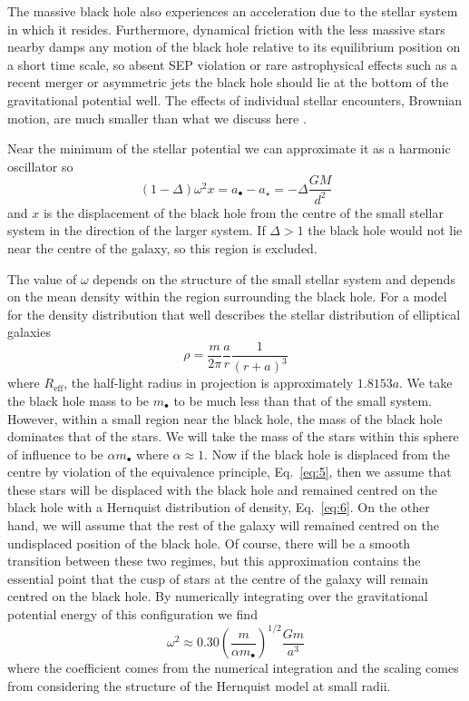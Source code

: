 \documentclass[useAMS,usenatbib]{mn2e}
\begin{document}
The massive black hole also experiences an acceleration due to the
stellar system in which it resides.  Furthermore, dynamical friction
with the less massive stars nearby damps any motion of the black hole
relative to its equilibrium position on a short time scale, so absent
SEP violation or rare astrophysical effects such as a recent merger or
asymmetric jets the black hole should lie at the bottom of the
gravitational potential well.  The effects of individual stellar
encounters, Brownian motion, are much smaller than what we discuss
here \citep{2011ApJ...735...57B}.

Near the minimum of the stellar potential we can approximate it as a
harmonic oscillator so
\begin{equation}
  \left (1 - \Delta \right) \omega^2 x
   = a_\bullet - a_\star = -\Delta \frac{GM}{d^2}
  \label{eq:5}
\end{equation}
and $x$ is the displacement of the black hole from the centre of the
small stellar system in the direction of the larger system. If
$\Delta>1$ the black hole would not lie near the centre of the galaxy,
so this region is excluded.

The value of $\omega$ depends on the structure of the small stellar
system and depends on the mean density within the region surrounding
the black hole.  For a \citet{1990ApJ...356..359H} model for the
density distribution that well describes the stellar distribution of
elliptical galaxies
\begin{equation}
  \rho = \frac{m}{2\pi} \frac{a}{r} \frac{1}{(r+a)^3}
  \label{eq:6}
\end{equation}
where $R_\mathrm{eff}$, the half-light radius in projection is
approximately $1.8153 a$.  We take the black hole mass to be
$m_\bullet$ to be much less than that of the small system.  However,
within a small region near the black hole, the mass of the black hole
dominates that of the stars.  We will take the mass of the stars
within this sphere of influence to be $\alpha m_\bullet$ where
$\alpha\approx 1$.  Now if the black hole is displaced from the centre
by violation of the equivalence principle, Eq.~\ref{eq:5}, then we
assume that these stars will be displaced with the black hole and
remained centred on the black hole with a Hernquist distribution of
density, Eq.~\ref{eq:6}.  On the other hand, we will assume that the
rest of the galaxy will remained centred on the undisplaced position
of the black hole.  Of course, there will be a smooth transition
between these two regimes, but this approximation contains the
essential point that the cusp of stars at the centre of the galaxy
will remain centred on the black hole.  By numerically integrating
over the gravitational potential energy of this configuration
we find 
\begin{equation}
  \omega^2 \approx 0.30 \left ( \frac{m}{\alpha m_\bullet} \right )^{1/2} \frac{Gm}{a^3}
  \label{eq:7}
\end{equation}
where the coefficient comes from the numerical integration and the scaling comes
from considering the structure of the Hernquist model at small radii.
\end{document}
